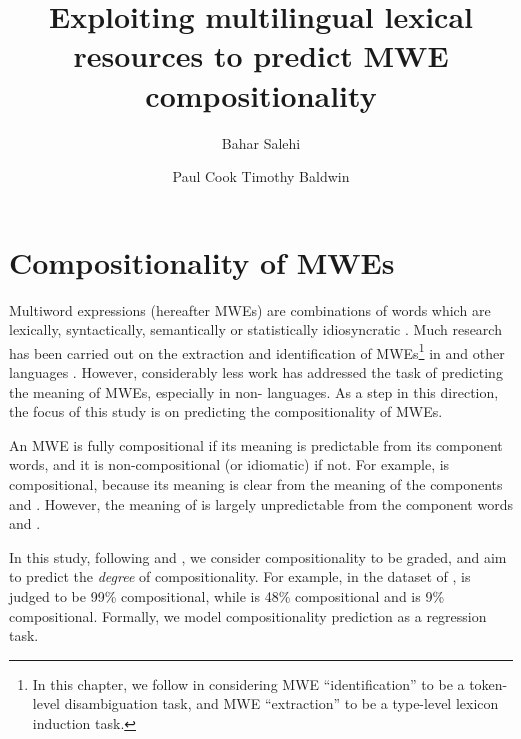 \documentclass[output=paper
,modfonts
,nonflat]{langsci/langscibook}
\title{Exploiting multilingual lexical resources to predict MWE compositionality}
\author{
Bahar Salehi\affiliation{The University of Melbourne}\and 
Paul Cook\affiliation{University of New Brunswick} \lastand
Timothy Baldwin\affiliation{The University of Melbourne} }
\begin{document}
\maketitle
\label{SALEHI-CHAPTER}



\section{Compositionality of MWEs\label{salehi:sec:intro}}


Multiword expressions (hereafter MWEs) are combinations of words which
are lexically, syntactically, semantically or statistically
idiosyncratic \citep{Sag2002a,baldwin2010multiword}. Much research has
been carried out on the extraction and identification of
MWEs\footnote{In this chapter, we follow \citet{baldwin2010multiword} in
  considering MWE ``identification'' to be a token-level
  disambiguation task, and MWE ``extraction'' to be a type-level
  lexicon induction task.} in 
\citep{Schone2001,Pecina2008,fazly-cook-stevenson:2009:CL} and other languages
\citep{dias2003,evert2005,salehi2012}. However, considerably less work
has addressed the task of predicting the meaning of MWEs, especially
in non- languages. As a step in this direction, the focus of
this study is on predicting the compositionality of MWEs.

An MWE is fully compositional if its meaning is predictable from its
component words, and it is non-compositional (or idiomatic) if
not. For example,   is
compositional, because its meaning is clear from the meaning of the
components  and . However, the meaning of
  is largely unpredictable
from the component words  and .

In this study, following \citet{mccarthy2003} and
\citet{reddy2011a}, we consider compositionality to be graded, and aim
to predict the \textit{degree} of compositionality. For example, in the
dataset of \citet{reddy2011a},  is judged to be
99\% compositional, while  is 48\% compositional and
 is 9\% compositional. Formally, we model
compositionality prediction as a regression task.
\end{document}
